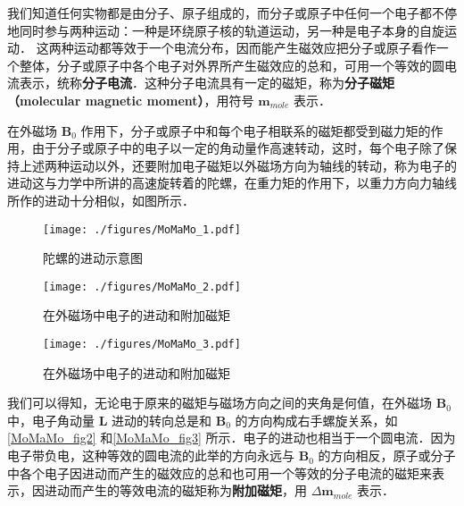 
我们知道任何实物都是由分子、原子组成的，而分子或原子中任何一个电子都不停地同时参与两种运动：一种是环绕原子核的轨道运动，另一种是电子本身的自旋运动． 这两种运动都等效于一个电流分布，因而能产生磁效应把分子或原子看作一个整体，分子或原子中各个电子对外界所产生磁效应的总和，可用一个等效的圆电流表示，统称\textbf{分子电流}．这种分子电流具有一定的磁矩，称为\textbf{分子磁矩（molecular magnetic moment）}，用符号 $\mathbf m_{mole}$ 表示．

在外磁场 $\mathbf B_0$ 作用下，分子或原子中和每个电子相联系的磁矩都受到磁力矩的作用，由于分子或原子中的电子以一定的角动量作高速转动，这时，每个电子除了保持上述两种运动以外，还要附加电子磁矩以外磁场方向为轴线的转动，称为电子的进动这与力学中所讲的高速旋转着的陀螺，在重力矩的作用下，以重力方向力轴线所作的进动十分相似，如图所示．
\begin{figure}[ht]
\centering
\texttt{[image: ./figures/MoMaMo\_1.pdf]}
\caption{陀螺的进动示意图} \label{MoMaMo_fig1}
\end{figure}
\begin{figure}[ht]
\centering
\texttt{[image: ./figures/MoMaMo\_2.pdf]}
\caption{在外磁场中电子的进动和附加磁矩} \label{MoMaMo_fig2}
\end{figure}
\begin{figure}[ht]
\centering
\texttt{[image: ./figures/MoMaMo\_3.pdf]}
\caption{在外磁场中电子的进动和附加磁矩} \label{MoMaMo_fig3}
\end{figure}

我们可以得知，无论电于原来的磁矩与磁场方向之间的夹角是何值，在外磁场 $\mathbf B_0$ 中，电子角动量 $\mathbf L$ 进动的转向总是和 $\mathbf B_0$ 的方向构成右手螺旋关系，如\autoref{MoMaMo_fig2} 和\autoref{MoMaMo_fig3} 所示．电子的进动也相当于一个圆电流．因为电子带负电，这种等效的圆电流的此举的方向永远与 $\mathbf B_0$ 的方向相反，原子或分子中各个电子因进动而产生的磁效应的总和也可用一个等效的分子电流的磁矩来表示，因进动而产生的等效电流的磁矩称为\textbf{附加磁矩}，用 $\Delta\mathbf m_{mole}$ 表示．
